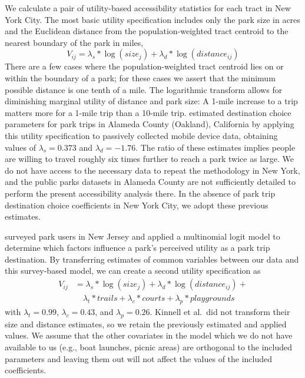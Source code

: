 \documentclass[shortAfour,sageh.bst]{sagej}
\begin{document}
\label{subsec:accessibility}

We calculate a pair of utility-based accessibility statistics for each
tract in New York City. The most basic utility specification includes
only the park size in acres and the Euclidean distance from the
population-weighted tract centroid to the nearest boundary of the park
in miles, \begin{equation}\label{eq:u_access}
V_{ij} = \lambda_s * \log(size_j) + \lambda_d * \log(distance_{ij})
\end{equation} There are a few cases where the population-weighted tract
centroid lies on or within the boundary of a park; for these cases we
assert that the minimum possible distance is one tenth of a mile. The
logarithmic transform allows for diminishing marginal utility of
distance and park size: A 1-mile increase to a trip matters more for a
1-mile trip than a 10-mile trip. \citet{Macfarlane2019} estimated
destination choice parameters for park trips in Alameda County
(Oakland), California by applying this utility specification to
passively collected mobile device data, obtaining values of
\(\lambda_s = 0.373\) and \(\lambda_d = -1.76\). The ratio of these
estimates implies people are willing to travel roughly six times further
to reach a park twice as large. We do not have access to the necessary
data to repeat the \citet{Macfarlane2019} methodology in New York, and
the public parks datasets in Alameda County are not sufficiently
detailed to perform the present accessibility analysis there. In the
absence of park trip destination choice coefficients in New York City,
we adopt these previous estimates.

\citet{Kinnell2006} surveyed park users in New Jersey and applied a
multinomial logit model to determine which factors influence a park's
perceived utility as a park trip destination. By transferring estimates
of common variables between our data and this survey-based model, we can
create a second utility specification as
\begin{equation}\label{eq:u_multi}
\begin{split}
V_{ij} & = \lambda_s * \log(size_j) + \lambda_d * \log(distance_{ij}) + \\ 
  & \quad \lambda_t * trails + \lambda_{c} * courts + \lambda_p * playgrounds
\end{split}
\end{equation} with \(\lambda_t = 0.99\), \(\lambda_c = 0.43\), and
\(\lambda_p = 0.26\). Kinnell et al.~did not transform their size and
distance estimates, so we retain the previously estimated and applied
values. We assume that the other covariates in the model which we do not
have available to us (e.g., boat launches, picnic areas) are orthogonal
to the included parameters and leaving them out will not affect the
values of the included coefficients.
\end{document}
